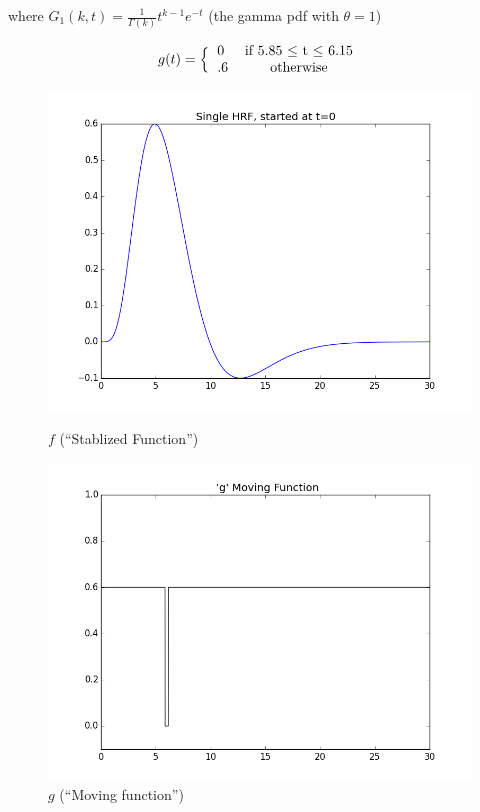 \documentclass[11pt]{article}
\begin{document}
where $G_1(k,t) =\frac{1}{\Gamma(k)} t^{k-1} e^{-t}$ (the gamma pdf with 
$\theta =1$)

\begin{equation} \label{eq:step}
 g(t)=\Big \{ \begin{tabular}{l c}
 		0  & if  5.85 $\leq$ t $\leq$ 6.15\\
 		.6  & otherwise \\
 		\end{tabular} \end{equation}
 		
 		
\begin{figure}[ht]
\centering
\begin{minipage}[b]{0.45\linewidth}
	\centering
	\includegraphics[width=.8\linewidth]{images/hrf_pattern.png} 
	\caption{$f$ (``Stablized Function'')}
	\label{fig:f}
\end{minipage}	
\quad
\begin{minipage}[b]{0.45\linewidth}
	\centering
		\includegraphics[width=.8\linewidth]{images/play.png} 
	\caption{$g$ (``Moving function'')}
	\label{fig:g}
\end{minipage}
\end{figure}
\end{document}

